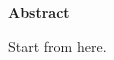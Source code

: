 \thispagestyle{empty}
\begin{center}
    {\large \bf Abstract}
\end{center}
% 
\par
\noindent
    Start from here.
